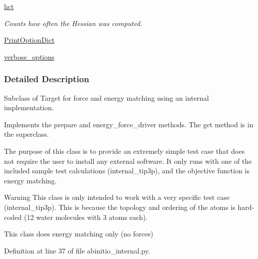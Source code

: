 \begin{DoxyCompactItemize}
\hyperlink{classforcebalance_1_1target_1_1Target_a5b5a42f78052b47f29ed4b940c6111a1}{hct}
\begin{DoxyCompactList}\small\item\em Counts how often the Hessian was computed. \end{DoxyCompactList}\item 
\hyperlink{classforcebalance_1_1baseclass_1_1ForceBalanceBaseClass_a5c55e661e746d1a4443f4e0bc34ebe05}{Print\-Option\-Dict}
\item 
\hyperlink{classforcebalance_1_1baseclass_1_1ForceBalanceBaseClass_a8088e1e20cbd6bc175fb9c9fe9fa0f18}{verbose\-\_\-options}
\end{DoxyCompactItemize}


\subsubsection{Detailed Description}
Subclass of Target for force and energy matching using an internal implementation. 

Implements the prepare and energy\-\_\-force\-\_\-driver methods. The get method is in the superclass.

The purpose of this class is to provide an extremely simple test case that does not require the user to install any external software. It only runs with one of the included sample test calculations (internal\-\_\-tip3p), and the objective function is energy matching.

\begin{DoxyWarning}{Warning}
This class is only intended to work with a very specific test case (internal\-\_\-tip3p). This is because the topology and ordering of the atoms is hard-\/coded (12 water molecules with 3 atoms each).

This class does energy matching only (no forces) 
\end{DoxyWarning}


Definition at line 37 of file abinitio\-\_\-internal.\-py.



